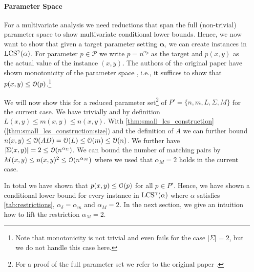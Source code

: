 \paragraph*{Parameter Space}
For a multivariate analysis we need reductions that span the full (non-trivial) parameter space to show multivariate conditional lower bounds.
Hence, we now want to show that given a target parameter setting $\mathbf{\alpha}$, we can create instances in $\text{LCS}^\gamma(\mathbf{\alpha})$.
For parameter $p \in \mathcal{P}$ we write $p = n^{\alpha_p}$ as the target and $p(x,y)$ as the actual value of the \lcs{} instance $(x,y)$.
%
The authors of the original paper have shown monotonicity of the parameter space \cite[section 4.2]{Bringman.2018}, i.e., it suffices to show that $p(x,y) \leq \mathcal{O}(p)$.\footnote{Note that monotonicity is not trivial and even fails for the case $|\Sigma| = 2$, but we do not handle this case here.}


We will now show this for a reduced parameter set\footnote{For a proof of the full parameter set we refer to the original paper \cite[section 9.1.2]{Bringman.2018}.} of $P' = \{n, m, L, \Sigma, M\}$ for the current case.
We have trivially and by definition $L(x,y) \leq m(x,y) \leq n(x,y)$.
With \autoref{thm:small_lcs_construction} (\ref{thm:small_lcs_construction:size}) and the definition of $A$ we can further bound $n(x,y) \leq \mathcal{O}(AD) = \mathcal{O}(L) \leq \mathcal{O}(m) \leq \mathcal{O}(n)$. %
We further have $|\Sigma(x,y)| = 2 \leq \mathcal{O}(n^{\alpha_\Sigma})$.
We can bound the number of matching pairs by $M(x,y) \leq n(x,y)^2 \leq \mathcal{O}(n^{\alpha_M})$ where we used that $\alpha_M = 2$ holds in the current case.

In total we have shown that $p(x,y) \leq \mathcal{O}(p)$ for all $p \in P'$.
Hence, we have shown a conditional lower bound for every instance in $\text{LCS}^\gamma(\mathbb{\alpha})$ where $\mathbb{\alpha}$ satisfies \autoref{tab:restrictions}, $\alpha_\delta = \alpha_m$ and $\alpha_M = 2$.
In the next section, we give an intuition how to lift the restriction $\alpha_M = 2$.


